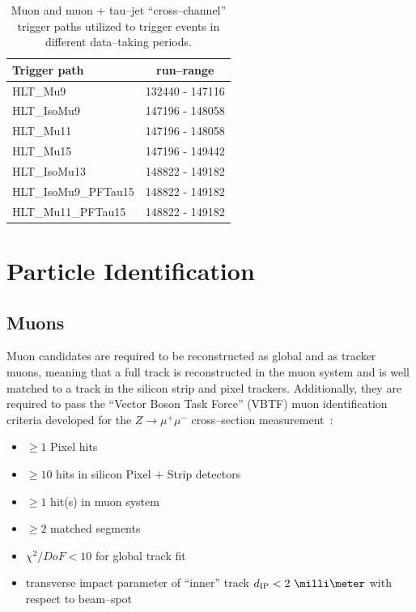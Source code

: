 \begin{table}[t]
\begin{center}

\begin{tabular}{|l|c|}
\hline
Trigger path & run--range \\
\hline
HLT\_Mu9             & 132440 - 147116 \\
HLT\_IsoMu9          & 147196 - 148058 \\
HLT\_Mu11            & 147196 - 148058 \\
HLT\_Mu15            & 147196 - 149442 \\
HLT\_IsoMu13         & 148822 - 149182 \\
HLT\_IsoMu9\_PFTau15 & 148822 - 149182 \\
HLT\_Mu11\_PFTau15   & 148822 - 149182 \\
\hline
\end{tabular}
\end{center}
\begin{center}
\caption[High Level Trigger paths used to select $\mu + \tau_h$ events]{\captiontext
Muon and muon + tau--jet ``cross--channel'' trigger paths utilized to trigger
events in different data--taking periods.}
\label{tab:AHtoMuTauTriggers}
\end{center}
\end{table}

\section{Particle Identification}
\subsection{Muons}
\label{sec:MuonId}

Muon candidates are required to be reconstructed as global and as tracker muons,
meaning that a full track is reconstructed in the muon system and is well
matched to a track in the silicon strip and pixel trackers.
Additionally, they are required to pass the ``Vector Boson Task Force'' (VBTF)
muon identification criteria developed for the $Z \to \mu^{+} \mu^{-}$
cross--section measurement~\cite{CMS-PAS-EWK-10-002}:
\begin{itemize}
\item $\geq 1$ Pixel hits
\item $\geq 10$ hits in silicon Pixel $+$ Strip detectors
\item $\geq 1$ hit(s) in muon system
\item $\geq 2$ matched segments
\item $\chi^{2}/DoF < 10$ for global track fit
\item transverse impact parameter of ``inner'' track $d_\text{IP} < 2~\milli\meter$
  with respect to beam--spot
\end{itemize}

